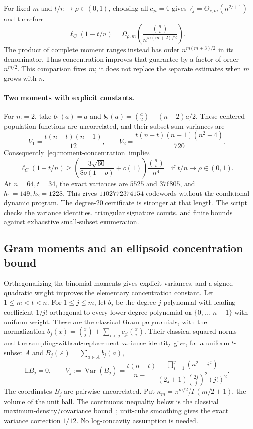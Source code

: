 \documentclass[11pt,letterpaper]{article}
\theoremstyle{definition}
\theoremstyle{remark}
\begin{document}
For fixed $m$ and $t/n\longrightarrow\rho\in(0,1)$, choosing
all $c_{ji}=0$ gives $V_j=\Theta_{\rho,m}(n^{2j+1})$ and therefore
\[
 \ell_C(1-t/n)=\Omega_{\rho,m}\left(
       \frac{\binom nt}{n^{m(m+2)/2}}\right).
\]
The product of complete moment ranges instead has order
$n^{m(m+3)/2}$ in its denominator. Thus concentration improves that
guarantee by a factor of order $n^{m/2}$. This comparison fixes $m$;
it does not replace the separate estimates when $m$ grows with $n$.

\paragraph{Two moments with explicit constants.}
For $m=2$, take $b_1(a)=a$ and
$b_2(a)=\binom a2-(n-2)a/2$. These centered population functions
are uncorrelated, and their subset-sum variances are
\[
 V_1=\frac{t(n-t)(n+1)}{12},\qquad
 V_2=\frac{t(n-t)(n+1)(n^2-4)}{720}.
\]
Consequently~\eqref{eq:moment-concentration} implies
\[
 \ell_C(1-t/n)\ge
 \left(\frac{3\sqrt{60}}{8\rho(1-\rho)}+o(1)\right)
 \frac{\binom nt}{n^4}
 \quad\text{if }t/n\longrightarrow\rho\in(0,1).
\]
At $n=64,t=34$, the exact variances are $5525$ and $376805$,
and $h_1=149,h_2=1228$. This gives $1102772374154$ codewords
without the conditional dynamic program. The degree-$20$ certificate
is stronger at that length. The script
 checks the
variance identities, triangular signature counts, and finite bounds
against exhaustive small-subset enumeration.



\subsection{Gram moments and an ellipsoid concentration bound}
\label{sec:gram-ellipsoid}

Orthogonalizing the binomial moments gives explicit variances, and a
signed quadratic weight improves the elementary concentration constant.
Let $1\le m<t<n$. For $1\le j\le m$, let $b_j$ be the degree-$j$
polynomial with leading coefficient $1/j!$ orthogonal to every
lower-degree polynomial on $\{0,\ldots,n-1\}$ with uniform weight.
These are the classical Gram polynomials, with the normalization
$b_j(x)=\binom xj+\sum_{i<j}c_{ji}\binom xi$.
Their classical squared norms~\cite[eqs.~(1.1)--(1.2)]{linwong}
and the sampling-without-replacement variance identity give, for a
uniform $t$-subset $A$ and $B_j(A)=\sum_{a\in A}b_j(a)$,
\begin{equation}\label{eq:gram-subset-variance}
 \mathbb E B_j=0,\qquad
 V_j:=\operatorname{Var}(B_j)
 =\frac{t(n-t)}{n-1}
   \frac{\prod_{i=1}^j(n^2-i^2)}
   {(2j+1)\binom{2j}{j}^{\!2}(j!)^2}.
\end{equation}
The coordinates $B_j$ are pairwise uncorrelated. Put
$\kappa_m=\pi^{m/2}/\Gamma(m/2+1)$, the volume of the unit ball.
The continuous inequality below is the classical maximum-density/covariance
bound~\cite[Proposition~III.1 and proof of Corollary~III.2]{bobkovmadiman};
unit-cube smoothing gives the exact variance correction $1/12$.
No log-concavity assumption is needed.
\end{document}
